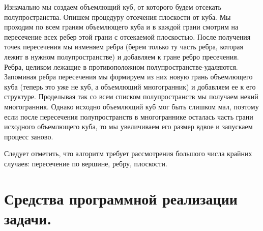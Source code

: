 \documentclass[14pt,fleqn,a4paper]{scrartcl}
\begin{document}
Изначально мы создаем объемлющий куб, от которого будем отсекать полупространства. Опишем процедуру отсечения плоскости от куба. Мы проходим по всем граням объемлющего куба и в каждой грани смотрим на пересечение всех ребер этой грани с отсекаемой плоскостью. После получения точек пересечения мы изменяем ребра (берем только ту часть ребра, которая лежит в нужном полупространстве) и добавляем к гране ребро пресечения. Ребра, целиком лежащие в противоположном полупространстве-удаляются. Запоминая ребра пересечения мы формируем из них новую грань объемлющего куба (теперь это уже не куб, а объемлющий многогранник) и добавляем ее к его структуре. Проделывая так со всем списком полупространств мы получаем некий многогранник. Однако исходно объемлющий куб мог быть слишком мал, поэтому если после пересечения полупространств в многограннике осталась часть грани исходного объемлющего куба, то мы увеличиваем его размер вдвое и запускаем процесс заново. 
\par
Следует отметить, что алгоритм требует рассмотрения большого числа крайних случаев: пересечение по вершине, ребру, плоскости. 

\section{Средства программной реализации задачи.}
\end{document}
